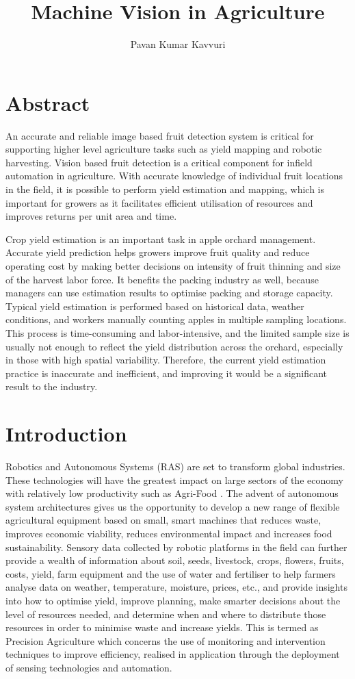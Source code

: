 \documentclass[12pt]{article}
\title{Machine Vision in Agriculture}
\author{\textup{Pavan Kumar Kavvuri}}
\begin{document}
    
    \newpage
    \section{Abstract}
    An accurate and reliable image based fruit detection system is critical for supporting higher level agriculture tasks such as yield mapping and robotic harvesting. Vision based 	fruit detection is a critical component for infield automation in agriculture. With accurate knowledge of individual fruit locations in the field, it is possible to perform yield 		estimation and mapping, which is important for growers as it facilitates efficient utilisation of resources and improves returns per unit area and time.
    
    Crop yield estimation is an important task in apple orchard management. Accurate yield prediction helps growers improve fruit quality and reduce operating cost by making 		better decisions on intensity of fruit thinning and size of the harvest labor force. It benefits the packing industry as well, because managers can use estimation results to 		optimise packing and storage capacity. Typical yield estimation is performed based on historical data, weather conditions, and workers manually counting apples in multiple 	sampling locations. This process is time-consuming and labor-intensive, and the limited sample size is usually not enough to reflect the yield distribution across the orchard, 	especially in those with high spatial variability. Therefore, the current yield estimation practice is inaccurate and inefficient, and improving it would be a significant result to the 	industry. 
    
    \newpage

\section{Introduction}

Robotics and Autonomous Systems (RAS) are set to transform global industries. These technologies will have the greatest impact on large sectors of the economy with relatively low productivity such as Agri-Food \cite{future_robotic_agri}.
The advent of autonomous system architectures gives us the opportunity to develop a new range of flexible agricultural equipment based on small, smart machines that reduces waste, improves economic viability, reduces environmental impact and increases food sustainability. Sensory data collected by robotic platforms in the field can further provide a wealth of information about soil, seeds, livestock, crops, flowers, fruits, costs, yield, farm equipment and the use of water and fertiliser to help farmers analyse data on weather, temperature, moisture, prices, etc., and provide insights into how to optimise yield, improve planning, make smarter decisions about the level of resources needed, and determine when and where to distribute those resources in order to minimise waste and increase yields\cite{views_forecasts}. This is termed as Precision Agriculture which concerns the use of monitoring and intervention techniques to improve efficiency, realised in application through the deployment of sensing technologies and automation.
\end{document}
